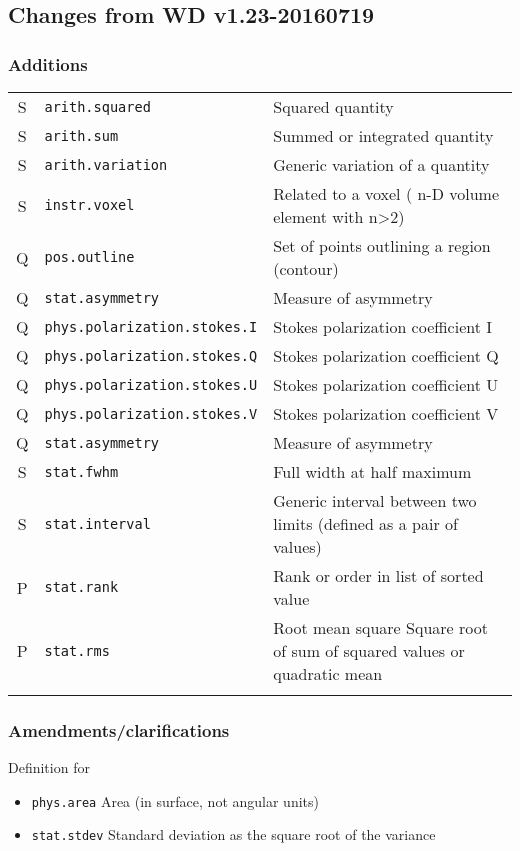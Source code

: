 \documentclass[11pt,a4paper]{ivoa}
\begin{document}
\subsection{Changes from WD v1.23-20160719}
\subsubsection*{Additions}
\footnotesize\begin{longtable}[h!]{c|p{39.5ex}|D{0.45\textwidth}}
\sptablerule
S & {\tt arith.squared} & Squared quantity\\
S & {\tt arith.sum} & Summed or integrated quantity\\
S & {\tt arith.variation} & Generic variation of a quantity\\
S & {\tt instr.voxel} & Related to a voxel ( n-D volume element with n>2)\\
Q & {\tt pos.outline} & Set of points outlining a region (contour)\\
Q & {\tt stat.asymmetry} & Measure of asymmetry\\
Q & {\tt phys.polarization.stokes.I} & Stokes polarization coefficient I\\
Q & {\tt phys.polarization.stokes.Q} & Stokes polarization coefficient Q\\
Q & {\tt phys.polarization.stokes.U} & Stokes polarization coefficient U\\
Q & {\tt phys.polarization.stokes.V} & Stokes polarization coefficient V\\
Q & {\tt stat.asymmetry} & Measure of asymmetry\\
S & {\tt stat.fwhm} & Full width at half maximum\\
S & {\tt stat.interval} & Generic interval between two limits (defined as a pair of values)\\
P & {\tt stat.rank} & Rank or order in list of sorted value\\
P & {\tt stat.rms} & Root mean square  Square root of sum of squared values or quadratic mean\\
\sptablerule
\end{longtable}

\subsubsection*{Amendments/clarifications}
Definition for 
\begin{itemize}
\item {\tt phys.area} Area (in surface, not angular units)
\item {\tt stat.stdev} Standard deviation as the square root of the variance                                                           
\end{itemize}
\end{document}
